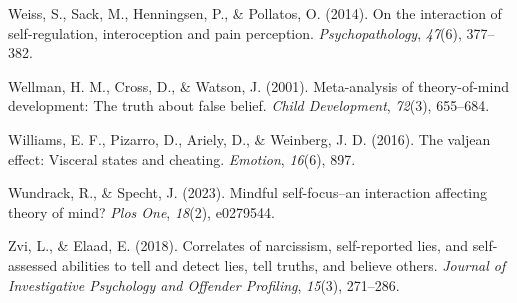 \documentclass[
  man,mask,floatsintext]{apa6}
\newlength{\cslhangindent}
\newlength{\cslentryspacingunit} %
\newenvironment{CSLReferences}[2] %
 {%
  \setlength{\parindent}{0pt}
  \ifodd #1
  \let\oldpar\par
  \def\par{\hangindent=\cslhangindent\oldpar}
  \fi
  \setlength{\parskip}{#2\cslentryspacingunit}
 }%
 {}
\begin{document}
\begin{CSLReferences}{1}{0}
\leavevmode{}%
Weiss, S., Sack, M., Henningsen, P., \& Pollatos, O. (2014). On the interaction of self-regulation, interoception and pain perception. \emph{Psychopathology}, \emph{47}(6), 377--382.

\leavevmode{}%
Wellman, H. M., Cross, D., \& Watson, J. (2001). Meta-analysis of theory-of-mind development: The truth about false belief. \emph{Child Development}, \emph{72}(3), 655--684.

\leavevmode{}%
Williams, E. F., Pizarro, D., Ariely, D., \& Weinberg, J. D. (2016). The valjean effect: Visceral states and cheating. \emph{Emotion}, \emph{16}(6), 897.

\leavevmode{}%
Wundrack, R., \& Specht, J. (2023). Mindful self-focus--an interaction affecting theory of mind? \emph{Plos One}, \emph{18}(2), e0279544.

\leavevmode{}%
Zvi, L., \& Elaad, E. (2018). Correlates of narcissism, self-reported lies, and self-assessed abilities to tell and detect lies, tell truths, and believe others. \emph{Journal of Investigative Psychology and Offender Profiling}, \emph{15}(3), 271--286.

\end{CSLReferences}

\endgroup
\end{document}
